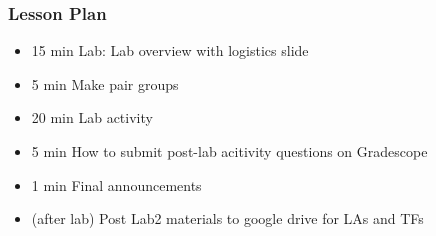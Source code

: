 \begin{frame}
    \frametitle{Lesson Plan}
    \begin{itemize}
        \item 15 min Lab: Lab overview with logistics slide
        \item 5 min Make pair groups
        \item 20 min Lab activity
        \item 5 min How to submit post-lab acitivity questions on Gradescope
        \item 1 min Final announcements 
        \item (after lab) Post Lab2 materials to google drive for LAs and TFs
    \end{itemize}
\end{frame}
    
